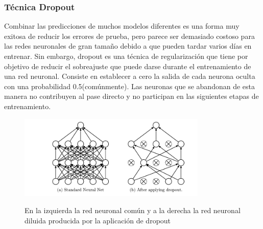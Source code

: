 		\vskip 0.4cm 
	\subsubsection {Técnica Dropout}
		\vskip 0.4cm 
		Combinar las predicciones de muchos modelos diferentes es una forma muy exitosa de reducir los errores de prueba, pero parece ser demasiado costoso para las redes neuronales de gran tamaño debido a que pueden tardar varios días en entrenar. Sin embargo, dropout es una técnica de regularización que tiene por objetivo de reducir el sobreajuste que puede darse durante el entrenamiento de una red neuronal. Consiste en establecer a cero la salida de cada neurona oculta con una probabilidad 0.5(comúnmente). Las neuronas que se abandonan de esta manera no contribuyen al pase directo y no participan en las siguientes etapas de entrenamiento.

		\begin{figure}[H]
		\begin{center}
		\includegraphics[width=0.8\textwidth]{images/marcoteorico/dropout_sample}
		\end{center}
		\begin{center}
		\caption{\small{En la izquierda la red neuronal común y a la derecha la red neuronal diluida producida por la aplicación de dropout}}
		{\small{\citep{AulaDNN}}}
		\end{center}
		\vspace{-1.5em}
		\end{figure}
		

